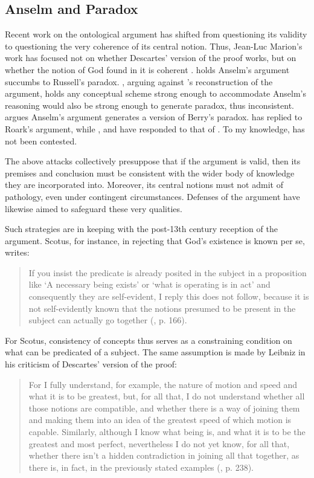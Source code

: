 \documentclass[]{birkjour}
\begin{document}
\subsection{Anselm and Paradox}
Recent work on the ontological argument has shifted from questioning its validity to questioning the very coherence of its central notion. Thus, Jean-Luc Marion's work has focused not on whether Descartes' version of the proof works, but on whether the notion of God found in it is coherent \cite{Marion1986}. \cite{Viger2002} holds Anselm's argument succumbs to Russell's paradox. \cite{Roark2003}, arguing against \cite{Klima2000}'s reconstruction of the argument, holds any conceptual scheme strong enough to accommodate Anselm's reasoning would also be strong enough to generate paradox, thus inconsistent. \cite{Schlenker2009} argues Anselm's argument generates a version of Berry's paradox. \cite{Klima2003} has replied to Roark's argument, while \cite{Neuhaus2007,Nowicki2006}, and \cite{Uckelman2010} have responded to that of \cite{Viger2002}. To my knowledge, \cite{Schlenker2009} has not been contested.
	
The above attacks collectively presuppose that if the argument is valid, then its premises and conclusion must be consistent with the wider body of knowledge they are incorporated into. Moreover, its central notions must not admit of pathology, even under contingent circumstances. Defenses of the argument have likewise aimed to safeguard these very qualities.
	
Such strategies are in keeping with the post-13th century reception of the argument. Scotus, for instance, in rejecting that God's existence is known per se, writes:
	
\begin{quote}
If you insist the predicate is already posited in the subject in a proposition like `A necessary being exists' or `what is operating is in act' and consequently they are self-evident, I reply this does not follow, because it is not self-evidently known that the notions presumed to be present in the subject can actually go together (\cite{Scotus1966}, p. 166).
\end{quote}
	
For Scotus, consistency of concepts thus serves as a constraining condition on what can be predicated of a subject. The same assumption is made by Leibniz in his criticism of Descartes' version of the proof:
	
\begin{quote}
For I fully understand, for example, the nature of motion and speed and what it is to be greatest, but, for all that, I do not understand whether all those notions are compatible, and whether there is a way of joining them and making them into an idea of the greatest speed of which motion is capable. Similarly, although I know what being is, and what it is to be the greatest and most perfect, nevertheless I do not yet know, for all that, whether there isn't a hidden contradiction in joining all that together, as there is, in fact, in the previously stated examples (\cite{AG}, p. 238).
\end{quote}
	
\end{document}
